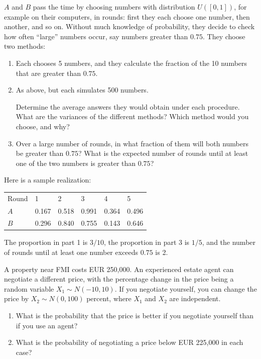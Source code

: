 \documentclass[a4paper]{report}
\begin{document}
\begin{problem}
$A$ and $B$ pass the time by choosing numbers with distribution $U([0,1])$, for example on their computers, in rounds: first they each choose one number, then another, and so on. Without much knowledge of probability, they decide to check how often ``large'' numbers occur, say numbers greater than $0.75$. They choose two methods:
\begin{enumerate}
\item Each chooses 5 numbers, and they calculate the fraction of the 10 numbers that are greater than $0.75$.
\item As above, but each simulates 500 numbers.

Determine the average answers they would obtain under each procedure. What are the variances of the different methods? Which method would you choose, and why?
\item Over a large number of rounds, in what fraction of them will both numbers be greater than $0.75$? What is the expected number of rounds until at least one of the two numbers is greater than $0.75$?
\end{enumerate}
\begin{it}
Here is a sample realization:
\begin{center}
\begin{tabular}{l||l|l|l|l|l}
Round &1&2&3&4&5\\
$A$ &0.167&0.518&0.991&0.364&0.496\\
$B$ &0.296&0.840&0.755&0.143&0.646
\end{tabular}
\end{center}
The proportion in part 1 is $3/10$, the proportion in part 3 is $1/5$, and the number of rounds until at least one number exceeds $0.75$ is 2.
\end{it}
\end{problem}
\begin{problem}
A property near FMI costs EUR 250,000. An experienced estate agent can negotiate a different price, with the percentage change in the price being a random variable $X_1\sim N(-10,10)$. If you negotiate yourself, you can change the price by $X_2\sim N(0,100)$ percent, where $X_1$ and $X_2$ are independent.
\begin{enumerate}
\item What is the probability that the price is better if you negotiate yourself than if you use an agent?
\item What is the probability of negotiating a price below EUR 225,000 in each case?
\end{enumerate}
\end{problem}
\end{document}
